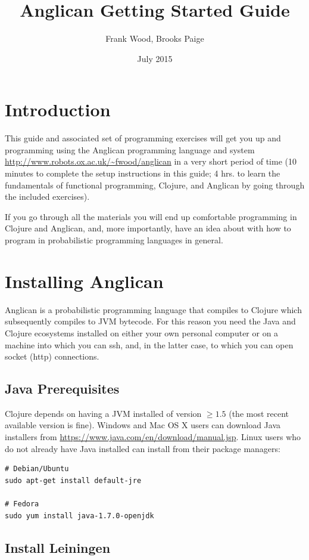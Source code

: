 \documentclass{article}
\title{Anglican Getting Started Guide}
\author{Frank Wood, Brooks Paige}
\date{July 2015}
\begin{document}
\maketitle

\section{Introduction}
This guide and associated set of programming exercises will get you up and programming 
using the Anglican programming language
and system \url{http://www.robots.ox.ac.uk/~fwood/anglican} in a very short period of time (10 minutes to complete the setup instructions in this guide; 4 hrs. to learn the fundamentals of functional programming, Clojure, and Anglican by going through the included exercises).

If you go through all the materials you will end up comfortable programming in Clojure 
and Anglican, and, more importantly, have an idea about with how to program in probabilistic
programming languages in general.

\section{Installing Anglican}

Anglican is a probabilistic programming language that compiles to Clojure which subsequently compiles to JVM bytecode.  For this reason
you need the Java and Clojure ecosystems installed on either your own personal computer or on a 
machine into which you can ssh, and, in the latter case, to which you can open socket (http) connections.  

\subsection{Java Prerequisites}

Clojure depends on having a JVM installed of version $\geq 1.5$ (the most recent available version is fine).  Windows and Mac OS X users can download Java installers from \url{https://www.java.com/en/download/manual.jsp}. Linux users who do not already have Java installed can install from their package managers:

\begin{verbatim}
# Debian/Ubuntu
sudo apt-get install default-jre

# Fedora
sudo yum install java-1.7.0-openjdk
\end{verbatim}

\subsection{Install Leiningen}
\end{document}
